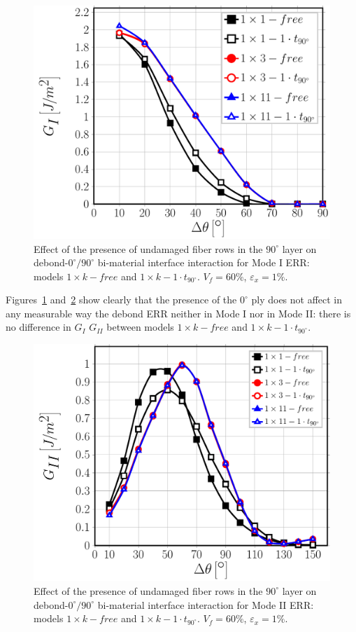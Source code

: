 \documentclass[review]{elsarticle}
\begin{document}
\begin{figure}[!h]
\centering
\includegraphics[width=\textwidth]{1xk-1-vf60-GI.pdf}
\caption{Effect of the presence of undamaged fiber rows in the $90^{\circ}$ layer on debond-$0^{\circ}/90^{\circ}$ bi-material interface interaction for Mode I ERR: models $1\times k-free$ and $1\times k-1\cdot t_{90^{\circ}}$. $V_{f}=60\%$, $\varepsilon_{x}=1\%$.}\label{fig:debonddebondGI}
\end{figure}

Figures~\ref{fig:debonddebondGI} and~\ref{fig:debonddebondGII} show clearly that the presence of the $0^{\circ}$ ply does not affect in any measurable way the debond ERR neither in Mode I nor in Mode II: there is no difference in $G_{I}$ $G_{II}$ between models $1\times k-free$ and $1\times k-1\cdot t_{90^{\circ}}$. 

\begin{figure}[!h]
\centering
\includegraphics[width=\textwidth]{1xk-1-vf60-GII.pdf}
\caption{Effect of the presence of undamaged fiber rows in the $90^{\circ}$ layer on debond-$0^{\circ}/90^{\circ}$ bi-material interface interaction for Mode II ERR: models $1\times k-free$ and $1\times k-1\cdot t_{90^{\circ}}$. $V_{f}=60\%$, $\varepsilon_{x}=1\%$.}\label{fig:debonddebondGII}
\end{figure}
\end{document}

